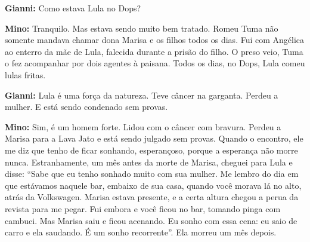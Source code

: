 \textbf{Gianni:} Como estava Lula no Dops?

\textbf{Mino:} Tranquilo. Mas estava sendo muito bem tratado. Romeu Tuma
não somente mandava chamar dona Marisa e os filhos todos os dias. Fui
com Angélica ao enterro da mãe de Lula, falecida durante a prisão do
filho. O preso veio, Tuma o fez acompanhar por dois agentes à paisana.
Todos os dias, no Dops, Lula comeu lulas fritas.

\textbf{Gianni:} Lula é uma força da natureza. Teve câncer na garganta.
Perdeu a mulher. E está sendo condenado sem provas.

\textbf{Mino:} Sim, é um homem forte. Lidou com o câncer com bravura.
Perdeu a Marisa para a Lava Jato e está sendo julgado sem provas. Quando
o encontro, ele me diz que tenho de ficar sonhando, esperançoso, porque
a esperança não morre nunca. Estranhamente, um mês antes da morte de
Marisa, cheguei para Lula e disse: ``Sabe que eu tenho sonhado muito com
sua mulher. Me lembro do dia em que estávamos naquele bar, embaixo de
sua casa, quando você morava lá no alto, atrás da Volkswagen. Marisa
estava presente, e a certa altura chegou a perua da revista para me
pegar. Fui embora e você ficou no bar, tomando pinga com cambuci. Mas
Marisa saiu e ficou acenando. Eu sonho com essa cena: eu saio de carro e
ela saudando. É um sonho recorrente''. Ela morreu um mês depois.
